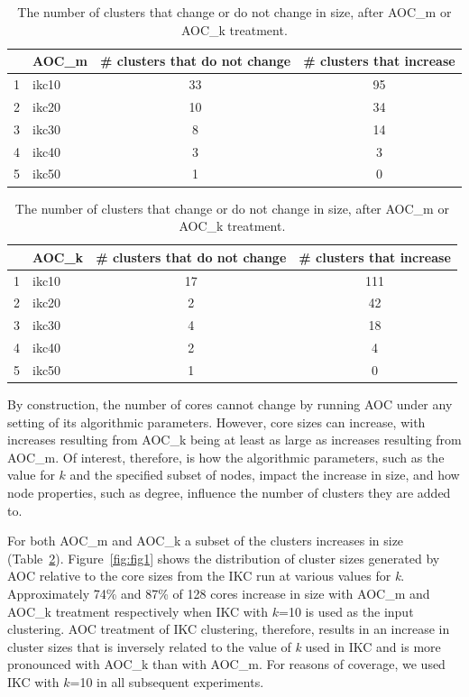 \documentclass[12pt, oneside]{article}   	%
\begin{document}
\begin{table}[H]
\centering
\begin{tabular}{rlcc}
\hline
& AOC\_m & \# clusters that do not change & \# clusters that increase\\ 
\hline
 1 & ikc10 &  33 &  95 \\ 
  2 & ikc20 &  10 &  34 \\ 
  3 & ikc30 &   8 &  14 \\ 
  4 & ikc40 &   3 &   3 \\ 
  5 & ikc50 &   1 &   0 \\ \hline
\end{tabular}
\quad
\begin{tabular}{rlcc}
\hline
& AOC\_k& \# clusters that do not change & \# clusters that increase \\ 
  \hline
 1 & ikc10 &  17 & 111 \\ 
  2 & ikc20 &   2 &  42 \\ 
  3 & ikc30 &   4 &  18 \\ 
  4 & ikc40 &   2 &   4 \\ 
  5 & ikc50 &   1 &   0 \\ 
   \hline
\end{tabular}
\caption{The number of clusters that change or do not change in size, after AOC\_m or AOC\_k treatment.}
\label{tab:tab-change-no-change}
\end{table}


By construction, the number of cores cannot change by running AOC  under any setting of its algorithmic parameters. However, core sizes can increase, with increases resulting from AOC\_k being at least as large as increases resulting from AOC\_m. Of interest, therefore, is how the algorithmic parameters, such as the value for $k$ and the specified subset of nodes, impact the increase in size, and how node properties, such as degree, influence the number of clusters they are added to.
	
For both AOC\_m and AOC\_k a subset of the clusters increases in size (Table~\ref{tab:tab-change-no-change}). 
Figure~\ref{fig:fig1} shows the distribution of cluster sizes generated by AOC relative to the core sizes from the IKC run at various values for \emph{k}.  Approximately 74\% and 87\% of  128 cores increase in size with AOC\_m and AOC\_k treatment respectively when IKC with $k$=10 is used as the input clustering. AOC treatment of IKC clustering, therefore, results in an increase in cluster sizes that is inversely related to the value of \emph{k} used in IKC and is more pronounced with AOC\_k than with AOC\_m. For reasons of coverage, we used IKC with $k$=10 in all subsequent experiments.
	
\end{document}
